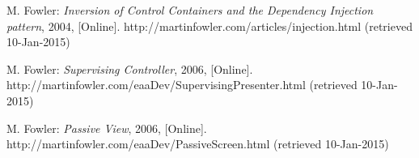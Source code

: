 \begin{thebibliography}{1}
M. Fowler: \emph{Inversion of Control Containers and the Dependency Injection pattern}, 2004, 
[Online]. http://martinfowler.com/articles/injection.html (retrieved 10-Jan-2015)

M. Fowler: \emph{Supervising Controller}, 2006, 
[Online]. http://martinfowler.com/eaaDev/SupervisingPresenter.html (retrieved 10-Jan-2015)

M. Fowler: \emph{Passive View}, 2006, 
[Online]. http://martinfowler.com/eaaDev/PassiveScreen.html (retrieved 10-Jan-2015)

\end{thebibliography}